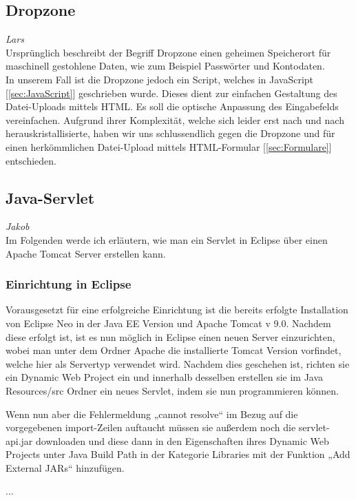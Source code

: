 \documentclass[12pt,a4paper,bibliography=totocnumbered,listof=totocnumbered]{scrartcl}
\begin{document}
\subsection{Dropzone}
\label{sec:Dropzone}
\emph{Lars}\\
Ursprünglich beschreibt der Begriff \glqq Dropzone\grqq{} einen geheimen Speicherort für maschinell gestohlene Daten, wie zum Beispiel Passwörter und Kontodaten.\cite{wiki/Dropzone} \\
In unserem Fall ist die Dropzone jedoch ein Script, welches in JavaScript [\ref{sec:JavaScript}] geschrieben wurde. Dieses dient zur einfachen Gestaltung des Datei-Uploads mittels HTML. Es soll die optische Anpassung des Eingabefelds vereinfachen. 
Aufgrund ihrer Komplexität, welche sich leider erst nach und nach herauskristallisierte, haben wir uns schlussendlich gegen die Dropzone und für einen herkömmlichen Datei-Upload mittels HTML-Formular [\ref{sec:Formulare}] entschieden.

\subsection{Java-Servlet}
\label{sec:Java-Servlet}
\emph{Jakob}\\
Im Folgenden werde ich erläutern, wie man ein Servlet in Eclipse über einen Apache Tomcat Server erstellen kann.

\subsubsection{Einrichtung in Eclipse}
Vorausgesetzt für eine erfolgreiche Einrichtung ist die bereits erfolgte Installation von Eclipse Neo in der Java EE Version und Apache Tomcat v 9.0. 
Nachdem  diese erfolgt ist, ist es nun möglich in Eclipse einen neuen Server einzurichten, wobei man unter dem Ordner Apache die installierte Tomcat Version vorfindet, welche hier  als Servertyp verwendet wird.
Nachdem dies geschehen ist, richten sie ein Dynamic Web Project ein und innerhalb desselben erstellen sie im Java Resources/src  Ordner ein neues Servlet, indem sie nun programmieren können.

Wenn nun aber die Fehlermeldung  „cannot resolve“ im Bezug auf die vorgegebenen import-Zeilen auftaucht müssen sie außerdem noch die servlet-api.jar downloaden und diese dann in den Eigenschaften ihres Dynamic Web Projects unter Java Build Path in der Kategorie Libraries mit der Funktion „Add External JARs“ hinzufügen. 

...
\end{document}
